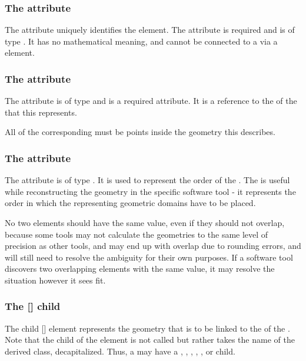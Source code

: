 \subsubsection{The \fixttspace{} attribute}
The  attribute uniquely identifies the \CSGObject element. The attribute is required and is of type .  It has no mathematical meaning, and cannot be connected to a \Parameter via a \SpatialSymbolReference element.

\subsubsection{The \fixttspace{} attribute}
The  attribute is of type  and is a required attribute. It is a reference to the  of the \DomainType that this \CSGObject represents.

All \InteriorPoints of the corresponding \DomainType must be points inside the geometry this \CSGObject describes.


\subsubsection{The \fixttspace{} attribute}
The  attribute is of type .  It is used to represent the order of the \CSGObject. The  is useful while reconstructing the geometry in the specific software tool - it represents the order in which the \CSGObjects representing geometric domains have to be placed.

No two \CSGObject elements should have the same  value, even if they should not overlap, because some tools may not calculate the geometries to the same level of precision as other tools, and may end up with overlap due to rounding errors, and will still need to resolve the ambiguity for their own purposes.  If a software tool discovers two overlapping \CSGObject elements with the same  value, it may resolve the situation however it sees fit.


\subsubsection{The [] child}

The child [] element represents the geometry that is to be linked to the  of the \CSGObject.  Note that the child of the \CSGObject element is not called  but rather takes the name of the derived class, decapitalized.  Thus, a \CSGObject may have a , , , , , or  child.


